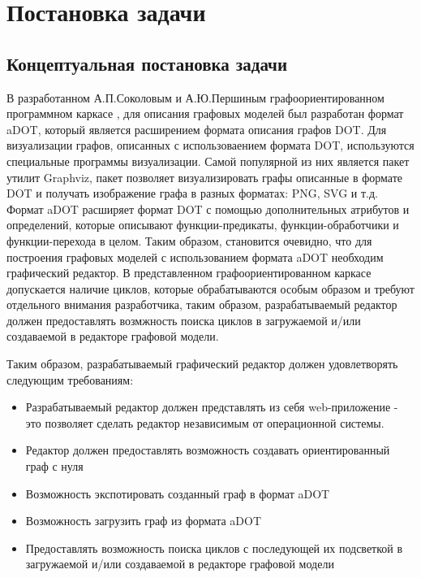 \chapter{Постановка задачи}
\section{Концептуальная постановка задачи}

В разработанном А.П.Соколовым и А.Ю.Першиным графоориентированном программном каркасе \cite{SokPersh2018GBSE} , для описания графовых моделей был разработан формат aDOT, который является расширением формата описания графов DOT. Для визуализации графов, описанных с использоваением формата DOT, используются специальные программы визуализации. Самой популярной из них является пакет утилит Graphviz, пакет позволяет визуализировать графы описанные в формате DOT и получать изображение графа в разных форматах: PNG, SVG и т.д. Формат aDOT расширяет формат DOT с помощью дополнительных атрибутов и определений, которые описывают функции-предикаты, функции-обработчики и функции-перехода в целом. Таким образом, становится очевидно, что для построения графовых моделей с использованием формата aDOT необходим графический редактор. В представленном графоориентированном каркасе допускается наличие циклов, которые обрабатываются особым образом и требуют отдельного внимания разработчика, таким образом, разрабатываемый редактор должен предоставлять возмжность поиска циклов в загружаемой и/или создаваемой в редакторе графовой модели.

Таким образом, разрабатываемый графический редактор должен удовлетворять следующим требованиям:
\begin{itemize}
	\item Разрабатываемый редактор должен представлять из себя web-приложение - это позволяет сделать редактор независимым от операционной системы.
	\item Редактор должен предоставлять возможность создавать ориентированный граф с нуля
	\item Возможность экспотировать созданный граф в формат aDOT
	\item Возможность загрузить граф из формата aDOT
	\item Предоставлять возможность поиска циклов с последующей их подсветкой в загружаемой и/или создаваемой в редакторе графовой модели
\end{itemize}
